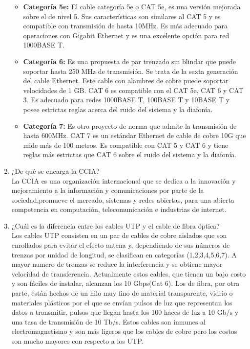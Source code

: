 \documentclass{article}
\begin{document}
\begin{enumerate}
\begin{itemize}
\item \textbf{Categoría 5e:}
El cable categoría 5e o CAT 5e, es una versión mejorada sobre el de nivel 5. Sus características son similares al CAT 5 y es compatible con transmisión de hasta 10MHz. Es más adecuado para operaciones con Gigabit Ethernet y es una excelente opción para red 1000BASE T.

\item \textbf{Categoría 6:}
Es una propuesta de par trenzado sin blindar que puede soportar hasta 250 MHz de transmisión. Se trata de la sexta generación del cable Ethernet. Este cable con alambres de cobre puede soportar velocidades de 1 GB. CAT 6 es compatible con el CAT 5e, CAT 6 y CAT 3. Es adecuado para redes 1000BASE T, 100BASE T y 10BASE T y posee estrictas reglas acerca del ruido del sistema y la diafonía.

\item \textbf{Categoría 7:}
Es otro proyecto de norma que admite la transmisión de hasta 600MHz. CAT 7 es un estándar Ethernet de cable de cobre 10G que mide más de 100 metros. Es compatible con CAT 5 y CAT 6 y tiene reglas más estrictas que CAT 6 sobre el ruido del sistema y la diafonía.
\end{itemize}

\item¿De qué se encarga la CCIA?\\
\newline La CCIA es una organización internacional que se dedica a la innovación y mejoramiento a la información y comunicaciones por parte de la sociedad,promueve el mercado, sistemas y redes abiertas, para una abierta competencia en computación, telecomunicación e industrias de internet.
\item¿Cuál es la diferencia entre los cables UTP y el cable de fibra óptica?\\
\newline Los cables UTP consisten en un par de cables de cobre aislados que son enrollados para evitar el efecto antena y, dependiendo de sus números de trenzas por unidad de longitud, se clasifican en categorías (1,2,3,4,5,6,7). A mayor numero de trenzas se reduce la interferencia y se obtiene mayor velocidad de transferencia.
Actualmente estos cables, que tienen un bajo costo y son fáciles de instalar, alcanzan los 10 Gbps(Cat 6).
Los de fibra, por otra parte, están hechos de un hilo muy fino de material transparente, vidrio o materiales plásticos por el que se envían pulsos de luz que representan los datos a transmitir, pulsos que llegan hasta los 100 haces de luz a 10 Gb/s y una tasa de transmisión de 10 Tb/s. Estos cables son inmunes al electromagnetismo y son más ligeros que los cables de cobre pero los costos son mucho mayores con respecto a los UTP.\\


\end{enumerate}
\end{document}
